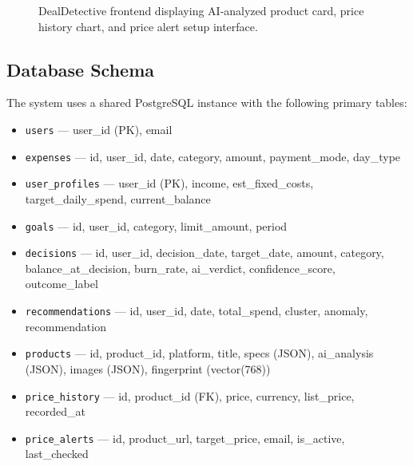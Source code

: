 \documentclass[]{IEEEtran}
\begin{document}
\begin{figure}[H]
    \centering
    \caption{DealDetective frontend displaying AI-analyzed product card, price history chart, and price alert setup interface.}
    \label{fig:dd_ui}
\end{figure}

\subsection{Database Schema}

The system uses a shared PostgreSQL instance with the following primary tables:

\begin{itemize}
    \item \texttt{users} --- user\_id (PK), email
    \item \texttt{expenses} --- id, user\_id, date, category, amount, payment\_mode, day\_type
    \item \texttt{user\_profiles} --- user\_id (PK), income, est\_fixed\_costs, target\_daily\_spend, current\_balance
    \item \texttt{goals} --- id, user\_id, category, limit\_amount, period
    \item \texttt{decisions} --- id, user\_id, decision\_date, target\_date, amount, category, balance\_at\_decision, burn\_rate, ai\_verdict, confidence\_score, outcome\_label
    \item \texttt{recommendations} --- id, user\_id, date, total\_spend, cluster, anomaly, recommendation
    \item \texttt{products} --- id, product\_id, platform, title, specs (JSON), ai\_analysis (JSON), images (JSON), fingerprint (vector(768))
    \item \texttt{price\_history} --- id, product\_id (FK), price, currency, list\_price, recorded\_at
    \item \texttt{price\_alerts} --- id, product\_url, target\_price, email, is\_active, last\_checked
\end{itemize}

\end{document}
